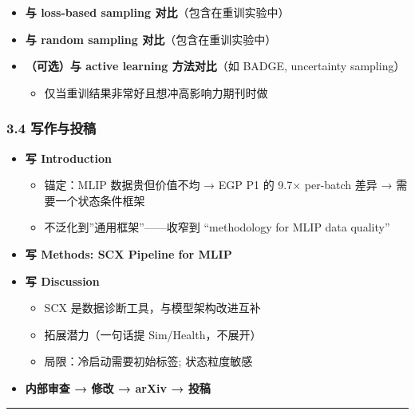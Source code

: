 \documentclass[
  12pt,
]{ctexart}
\providecommand{\tightlist}{%
  \setlength{\itemsep}{0pt}\setlength{\parskip}{0pt}}
\begin{document}
\begin{itemize}
\tightlist
\item[$\square$]
  \textbf{与 loss-based sampling 对比}（包含在重训实验中）
\item[$\square$]
  \textbf{与 random sampling 对比}（包含在重训实验中）
\item[$\square$]
  \textbf{（可选）与 active learning 方法对比}（如 BADGE, uncertainty
  sampling）

  \begin{itemize}
  \tightlist
  \item
    仅当重训结果非常好且想冲高影响力期刊时做
  \end{itemize}
\end{itemize}

\subsubsection{3.4 写作与投稿}\label{ux5199ux4f5cux4e0eux6295ux7a3f}

\begin{itemize}
\tightlist
\item[$\square$]
  \textbf{写 Introduction}

  \begin{itemize}
  \tightlist
  \item
    锚定：MLIP 数据贵但价值不均 → EGP P1 的 9.7× per-batch 差异 →
    需要一个状态条件框架
  \item
    不泛化到''通用框架''------收窄到 ``methodology for MLIP data
    quality''
  \end{itemize}
\item[$\square$]
  \textbf{写 Methods: SCX Pipeline for MLIP}
\item[$\square$]
  \textbf{写 Discussion}

  \begin{itemize}
  \tightlist
  \item
    SCX 是数据诊断工具，与模型架构改进互补
  \item
    拓展潜力（一句话提 Sim/Health，不展开）
  \item
    局限：冷启动需要初始标签; 状态粒度敏感
  \end{itemize}
\item[$\square$]
  \textbf{内部审查 → 修改 → arXiv → 投稿}
\end{itemize}

\begin{center}\rule{0.5\linewidth}{0.5pt}\end{center}
\end{document}
